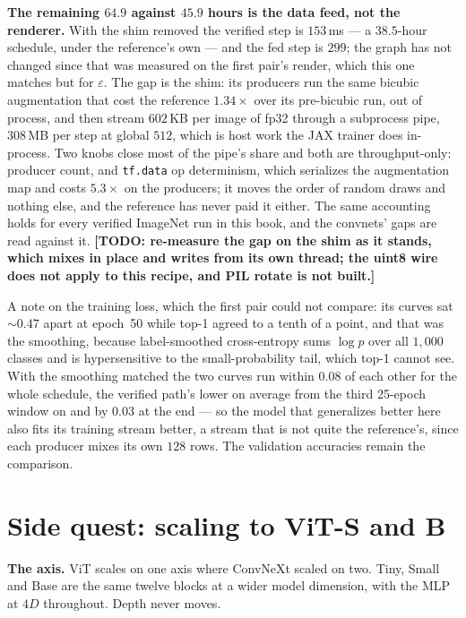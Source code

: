 \medskip\noindent\textbf{The remaining $64.9$ against $45.9$ hours is the data
feed, not the renderer.} With the shim removed the verified step is
$153$\,ms --- a $38.5$-hour schedule, under the reference's own ---
and the fed step is $299$; the graph has not changed since that was
measured on the first pair's render, which this one matches but for
$\varepsilon$. The gap is the shim: its producers run the same bicubic
augmentation that cost the reference $1.34\times$ over its pre-bicubic
run, out of process, and then stream $602$\,KB per image of fp32 through
a subprocess pipe, $308$\,MB per step at global $512$, which is host
work the JAX trainer does in-process. Two knobs close most of the pipe's
share and both are throughput-only: producer count, and \texttt{tf.data}
op determinism, which serializes the augmentation map and costs
$5.3\times$ on the producers; it moves the order of random draws and
nothing else, and the reference has never paid it either.
The same accounting holds for every verified ImageNet run in this book,
and the convnets' gaps are read against it.
\textbf{[TODO: re-measure the gap on the shim as it stands, which mixes
in place and writes from its own thread; the uint8 wire does not apply to
this recipe, and PIL rotate is not built.]}

\medskip\noindent A note on the training loss, which the first pair could
not compare: its curves sat ${\sim}0.47$ apart at epoch~50 while top-1
agreed to a tenth of a point, and that was the smoothing, because
label-smoothed cross-entropy sums $\log p$ over all $1{,}000$ classes and
is hypersensitive to the small-probability tail, which top-1 cannot see.
With the smoothing matched the two curves run within $0.08$ of each other
for the whole schedule, the verified path's lower on average from the
third 25-epoch window on and by $0.03$ at the end --- so the model that
generalizes better here also fits its training stream better, a stream
that is not quite the reference's, since each producer mixes its own
$128$ rows. The validation accuracies remain the comparison.

\section{Side quest: scaling to ViT-S and B}
\label{sec:vit_sb}

\textbf{The axis.} ViT scales on one axis where ConvNeXt scaled on two. Tiny,
Small and Base are the same twelve blocks at a wider model dimension, with the
MLP at $4D$ throughout. Depth never moves.

